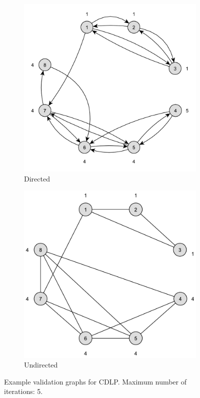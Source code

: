 \begin{figure}[h]
	\centering
	\begin{subfigure}{0.496\textwidth}
		\centering
		\includegraphics[scale=\examplescale]{figures/examples/cdlp-dir.pdf}
		\caption{Directed}
	\end{subfigure}
	\begin{subfigure}{0.496\textwidth}
		\centering
		\includegraphics[scale=\examplescale]{figures/examples/cdlp-undir.pdf}
		\caption{Undirected}
	\end{subfigure}
	\caption{Example validation graphs for CDLP. Maximum number of iterations: 5.}
	\label{fig:cdlp_example}
\end{figure}

